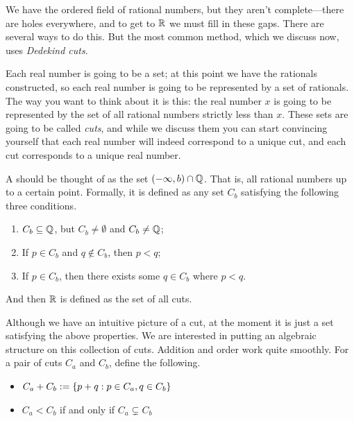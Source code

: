 \begin{proofsketch}
  We have the ordered field of rational numbers, but they aren't
  complete—there are holes everywhere, and to get to $\mathbb R$ we must
  fill in these gaps. There are several ways to do this. But the most
  common method, which we discuss now, uses \textit{Dedekind cuts}.

  Each real number is going to be a set; at this point we have the
  rationals constructed, so each real number is going to be
  represented by a set of rationals. The way you want to think about
  it is this: the real number $x$ is going to be represented by the
  set of all rational numbers strictly less than $x$. These sets are
  going to be called \textit{cuts}, and while we discuss them you can
  start convincing yourself that each real number will indeed
  correspond to a unique cut, and each cut corresponds to a unique real number.

  \begin{definition}
    A  should be thought of as the set $(-\infty, b) \cap
    \mathbb Q$. That is, all rational numbers up to a certain point.
    Formally, it is defined as any set $C_b$ satisfying the following
    three conditions.
    \begin{enumerate}
      \item $C_b \subseteq \mathbb Q$, but $C_b \neq \emptyset$ and $C_b \neq \mathbb Q$;
      \item If $p \in C_b$ and $q \notin C_b$, then $p < q$;
      \item If $p \in C_b$, then there exists some $q \in C_b$ where $p < q$.
    \end{enumerate}
  \end{definition}

  And then $\mathbb R$ is defined as the set of all cuts.

  Although we have an intuitive picture of a cut, at the moment it is
  just a set satisfying the above properties. We are interested in
  putting an algebraic structure on this collection of cuts. Addition
  and order work quite smoothly. For a pair of cuts $C_a$ and $C_b$,
  define the following.
  \begin{itemize}
    \item $C_a + C_b := \{ p + q : p \in C_a, q \in C_b \}$
    \item $C_a < C_b$ if and only if $C_a \subsetneq C_b$
  \end{itemize}


\end{proofsketch}
